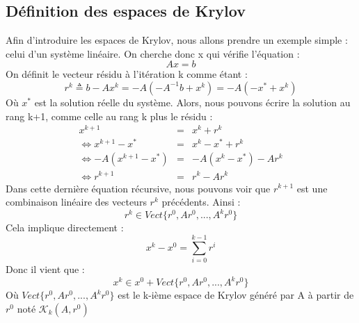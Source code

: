 \subsection{Définition des espaces de Krylov}
Afin d'introduire les espaces de Krylov, nous allons prendre un exemple simple : celui d'un système linéaire. On cherche donc x qui vérifie l'équation : 
\begin{equation}
Ax = b
\end{equation}
On définit le vecteur résidu à l'itération k comme étant : 
\begin{equation}
r^k \triangleq b - Ax^k = -A ( - A^{-1}b + x^k) = -A (- x^* + x^k)
\end{equation}
Où $x^*$ est la solution réelle du système. Alors, nous pouvons écrire la solution au rang k+1, comme celle au rang k plus le résidu : 
\begin{eqnarray}
x^{k+1} &=& x^k + r^k\\
\Leftrightarrow x^{k+1} - x^* &=& x^k - x^* + r^k\\
\Leftrightarrow -A( x^{k+1} - x^*) &=& -A(x^k - x^*) - Ar^k\\
\Leftrightarrow r^{k+1} &=& r^k - Ar^k
\end{eqnarray}
Dans cette dernière équation récursive, nous pouvons voir que $r^{k+1}$ est une combinaison linéaire des vecteurs $r^k$ précédents. Ainsi :
\begin{equation}
r^k \in Vect\{r^0, Ar^0, ..., A^kr^0\}
\end{equation}
Cela implique directement : 
\begin{equation}
x^k - x^0 = \sum_{i = 0}^{k-1}r^i
\end{equation}
Donc il vient que : 
\begin{equation}
x^k \in x^0 + Vect\{r^0, Ar^0, ..., A^kr^0\}
\end{equation}
Où $Vect\{r^0, Ar^0, ..., A^kr^0\}$ est le k-ième espace de Krylov généré par A à partir de $r^0$ noté $\mathcal{K}_k(A, r^0)$
